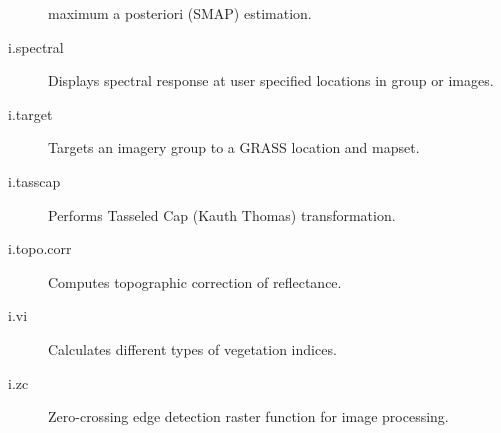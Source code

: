 \begin{description}
maximum a posteriori (SMAP) estimation.
\item [{i.spectral}] Displays spectral response at user specified locations
in group or images.
\item [{i.target}] Targets an imagery group to a GRASS location and mapset.
\item [{i.tasscap}] Performs Tasseled Cap (Kauth Thomas) transformation.
\item [{i.topo.corr}] Computes topographic correction of reflectance.
\item [{i.vi}] Calculates different types of vegetation indices.
\item [{i.zc}] Zero-crossing \textquotedbl{}edge detection\textquotedbl{}
raster function for image processing.\end{description}

